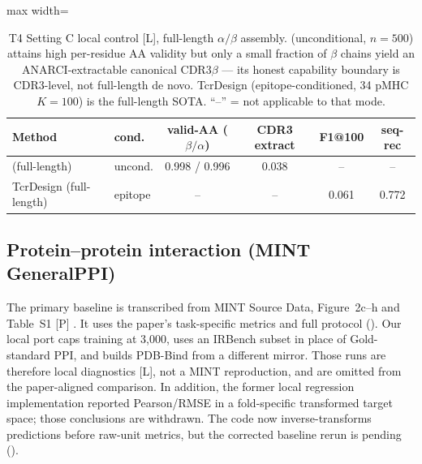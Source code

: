 \begin{table}[t]
\centering
\caption{T4 Setting C local control [L], full-length $\alpha/\beta$ assembly. \Ours{}
(unconditional, $n{=}500$) attains high per-residue AA validity but only a small
fraction of $\beta$ chains yield an ANARCI-extractable canonical CDR3$\beta$ ---
its honest capability boundary is CDR3-level, not full-length de novo. TcrDesign
(epitope-conditioned, 34 pMHC $K{=}100$) is the full-length SOTA. ``--'' = not
applicable to that mode.}
\label{tab:t4-setc}
\small
\setlength{\tabcolsep}{4pt}
\begin{adjustbox}{max width=\textwidth}
\begin{tabular}{@{}llcccc@{}}
\toprule
Method & cond. & valid-AA ($\beta/\alpha$) & CDR3 extract & F1@100 & seq-rec \\
\midrule
\OursCkpt{} (full-length) & uncond. & 0.998 / 0.996 & 0.038 & -- & -- \\
TcrDesign (full-length)   & epitope & -- & -- & 0.061 & 0.772 \\
\bottomrule
\end{tabular}
\end{adjustbox}
\end{table}

\subsection{Protein--protein interaction (MINT GeneralPPI)}
\label{sec:mint}

The primary baseline is transcribed from MINT Source Data, Figure~2c--h and
Table~S1 [P] \citep{ullanat2026mint}. It uses the paper's task-specific metrics
and full protocol (). Our local port caps training at 3,000,
uses an IRBench subset in place of Gold-standard PPI, and builds PDB-Bind from
a different mirror. Those runs are therefore local diagnostics [L], not a MINT
reproduction, and are omitted from the paper-aligned comparison. In addition,
the former local regression implementation reported Pearson/RMSE in a
fold-specific transformed target space; those conclusions are withdrawn. The
code now inverse-transforms predictions before raw-unit metrics, but the
corrected baseline rerun is pending ().

